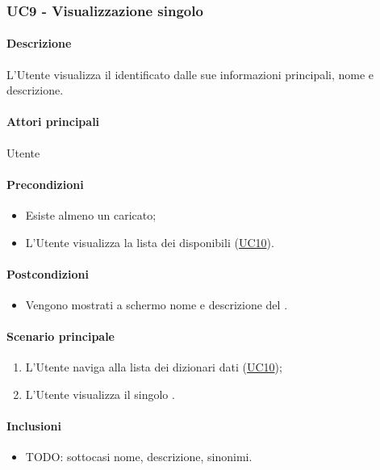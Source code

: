 \subsubsection{UC9 - Visualizzazione singolo }\label{UC9}
\paragraph*{Descrizione}
L’Utente visualizza il  identificato dalle sue informazioni principali, nome e descrizione.

\paragraph*{Attori principali}
Utente

\paragraph*{Precondizioni}
\begin{itemize}
  \item Esiste almeno un  caricato;
  \item L'Utente visualizza la lista dei  disponibili (\hyperref[UC10]{UC10}).
\end{itemize}

\paragraph*{Postcondizioni}
\begin{itemize}
  \item Vengono mostrati a schermo nome e descrizione del .
\end{itemize}

\paragraph*{Scenario principale}
\begin{enumerate}
  \item L’Utente naviga alla lista dei dizionari dati (\hyperref[UC10]{UC10});
  \item L’Utente visualizza il singolo .
\end{enumerate}

\paragraph*{Inclusioni}
\begin{itemize}
  \item TODO: sottocasi nome, descrizione, sinonimi.
\end{itemize}
